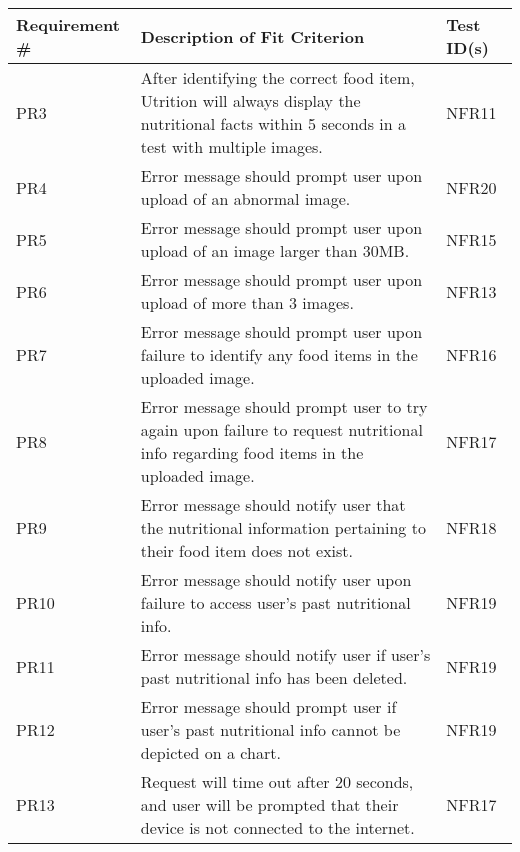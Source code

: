 \documentclass[12pt, titlepage]{article}
\begin{document}
	\begin{table}[H]
		\begin{tabularx}{\textwidth}{|l|X|l|}
			\hline
			{\bf Requirement \#} & {\bf Description of Fit Criterion} & {\bf Test ID(s)}\\
			\hline
			PR3 & After identifying the correct food item, Utrition will always display the nutritional facts within 5 seconds in a test with multiple images. & NFR11 \\
			\hline
			PR4 & Error message should prompt user upon upload of an abnormal 
			image. & NFR20\\
			\hline
			PR5 & Error message should prompt user upon upload of an image 
			larger than 30MB. & NFR15\\
			\hline
			PR6 & Error message should prompt user upon upload of more than 3 
			images. & NFR13\\
			\hline
			PR7 & Error message should prompt user upon failure to identify 
			any food items in the uploaded image. & NFR16\\
			\hline
			PR8 & Error message should prompt user to try again upon failure 
			to request nutritional info regarding food items in the uploaded image. & NFR17\\
			\hline
			PR9 & Error message should notify user that the nutritional 
			information pertaining to their food item does not exist. & NFR18\\
			\hline
			PR10 & Error message should notify user upon failure to access 
			user's past nutritional info. & NFR19\\
			\hline
			PR11 & Error message should notify user if user's past nutritional 
			info has been deleted. & NFR19\\
			\hline
			PR12 & Error message should prompt user if user's past nutritional 
			info cannot be depicted on a chart. & NFR19\\
			\hline
			PR13 & Request will time out after 20 seconds, and user will be 
			prompted that their device is not connected to the internet. & NFR17\\
			\hline
		\end{tabularx}
	\end{table}
	
\end{document}
